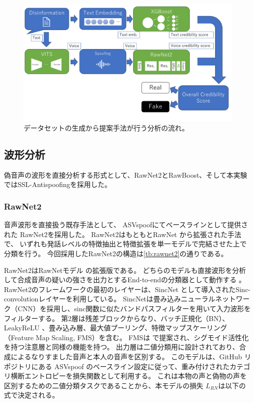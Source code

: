 \begin{figure}[p]
    \centering
    \includegraphics[width=\linewidth]{figures/Structure.pdf}
    \caption{データセットの生成から提案手法が行う分析の流れ。}
    \label{fig:structure}
\end{figure}

\subsection{波形分析}
偽音声の波形を直接分析する形式として、RawNet2とRawBoost、そして本実験ではSSL-Antispoofingを採用した。

\subsubsection{RawNet2}
音声波形を直接扱う既存手法として、
ASVspoofにてベースラインとして提供された \cite{WANG2020101114}RawNet2を採用した。
RawNet2はもともとRawNet \cite{jung19b_interspeech}から拡張された手法で、
いずれも発話レベルの特徴抽出と特徴拡張を単一モデルで完結させた上で分類を行う。
今回採用したRawNet2の構造は\cref{tb:rawnet2}の通りである。

RawNet2はRawNetモデル \cite{jung19b_interspeech}の拡張版である。
どちらのモデルも直接波形を分析して合成音声の疑いの強さを出力とするEnd-to-endの分類器として動作する \cite{jung19b_interspeech}。
RawNet2のフレームワークの最初のレイヤーは、SincNet \cite{8639585,ravanelli19_interspeech}として導入されたSinc-convolutionレイヤーを利用している。
SincNetは畳み込みニューラルネットワーク（CNN）を採用し、sinc関数に似たバンドパスフィルターを用いて入力波形をフィルターする。
第2層は残差ブロックからなり、バッチ正規化（BN）、LeakyReLU \cite{maas2013rectifier}、畳み込み層、最大値プーリング、特徴マップスケーリング（Feature Map Scaling, FMS）を含む。
FMSは \cite{woo2018cbam}で提案され、シグモイド活性化 \cite{jung20c_interspeech}を持つ注意層と同様の機能を持つ。
出力層は二値分類用に設計されており、合成によるなりすました音声と本人の音声を区別する。
このモデルは、GitHub リポジトリにある ASVspoof のベースライン設定に従って、重み付けされたカテゴリ横断エントロピーを損失関数として利用する。
これは本物の声と偽物の声を区別するための二値分類タスクであることから、本モデルの損失 $ L_{RN} $は以下の式で決定される。

